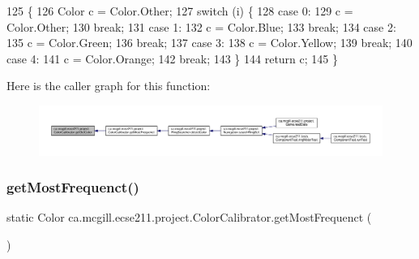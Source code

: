 \begin{DoxyCode}
125                                          \{
126     Color c = Color.Other;
127     \textcolor{keywordflow}{switch} (i) \{
128       \textcolor{keywordflow}{case} 0:
129         c = Color.Other;
130         \textcolor{keywordflow}{break};
131       \textcolor{keywordflow}{case} 1:
132         c = Color.Blue;
133         \textcolor{keywordflow}{break};
134       \textcolor{keywordflow}{case} 2:
135         c = Color.Green;
136         \textcolor{keywordflow}{break};
137       \textcolor{keywordflow}{case} 3:
138         c = Color.Yellow;
139         \textcolor{keywordflow}{break};
140       \textcolor{keywordflow}{case} 4:
141         c = Color.Orange;
142         \textcolor{keywordflow}{break};
143     \}
144     \textcolor{keywordflow}{return} c;
145   \}
\end{DoxyCode}
Here is the caller graph for this function\+:
\nopagebreak
\begin{figure}[H]
\begin{center}
\leavevmode
\includegraphics[width=350pt]{classca_1_1mcgill_1_1ecse211_1_1project_1_1_color_calibrator_acb1d9cef0739971dbe00cc16712be0fe_icgraph}
\end{center}
\end{figure}
\mbox{\label{classca_1_1mcgill_1_1ecse211_1_1project_1_1_color_calibrator_a3d65927aaa2041f933dbdc19c3d2a412}} 
\subsubsection{\texorpdfstring{get\+Most\+Frequenct()}{getMostFrequenct()}}
{\footnotesize\ttfamily static Color ca.\+mcgill.\+ecse211.\+project.\+Color\+Calibrator.\+get\+Most\+Frequenct (\begin{DoxyParamCaption}{ }\end{DoxyParamCaption})\hspace{0.3cm}{\ttfamily [static]}}

